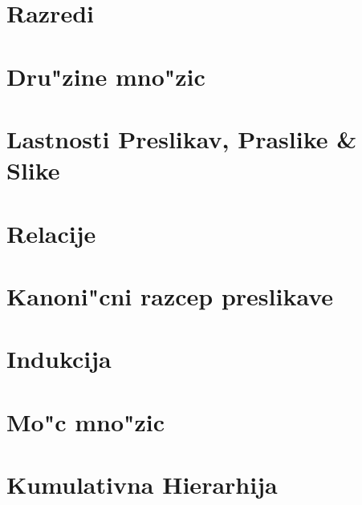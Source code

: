 \documentclass[a4paper, 12pt]{article}
\begin{document}
	\section{Razredi}
	
	
	\section{Dru"zine mno"zic}
	
	
	\section{Lastnosti Preslikav, Praslike \& Slike}
	
	
	\section{Relacije}
	
	
	\section{Kanoni"cni razcep preslikave}
	
	
	\section{Indukcija}
	
	
	\section{Mo"c mno"zic}
	
	
	\section{Kumulativna Hierarhija}
	
\end{document}
